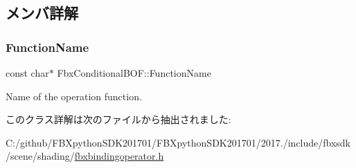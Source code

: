 \subsection{メンバ詳解}
\mbox{\label{class_fbx_conditional_b_o_f_ac0653f2120f3d07ea7c308611b9f2bbc}} 
\subsubsection{\texorpdfstring{Function\+Name}{FunctionName}}
{\footnotesize\ttfamily const char$\ast$ Fbx\+Conditional\+B\+O\+F\+::\+Function\+Name\hspace{0.3cm}{\ttfamily [static]}}



Name of the operation function. 



このクラス詳解は次のファイルから抽出されました\+:\begin{DoxyCompactItemize}
\item 
C\+:/github/\+F\+B\+Xpython\+S\+D\+K201701/\+F\+B\+Xpython\+S\+D\+K201701/2017./include/fbxsdk/scene/shading/\hyperlink{fbxbindingoperator_8h}{fbxbindingoperator.\+h}\end{DoxyCompactItemize}
